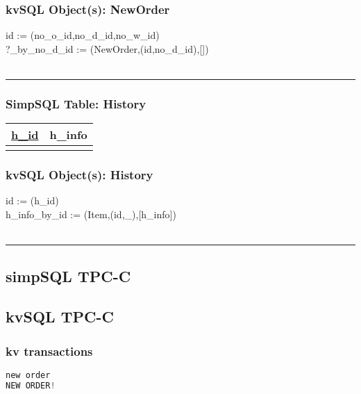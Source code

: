 \documentclass[12pt,letter]{article}
\begin{document}
\subsubsection*{kvSQL Object(s): NewOrder}  
id := (no\_o\_id,no\_d\_id,no\_w\_id) \\
?\_by\_no\_d\_id :=
(NewOrder,(id,no\_d\_id),[]) \\
\\ 
\hrule

\subsubsection*{SimpSQL Table: History}  
\begin{tabular}{ |c|c| }
 \hline
 \underline{h\_id} & h\_info\\
 \hline
 &   \\
 \hline
\end{tabular}

\subsubsection*{kvSQL Object(s): History}  
id := (h\_id)\\
 h\_info\_by\_id := 
(Item,(id,\_),[h\_info]) \\
\\
\hrule










\newpage
\subsection*{simpSQL TPC-C}







\subsection*{kvSQL TPC-C}


\subsubsection{kv transactions}
\begin{lstlisting}[language=Python, caption=NewOrder Transaction]
new order
NEW ORDER!
\end{lstlisting}
\end{document}
